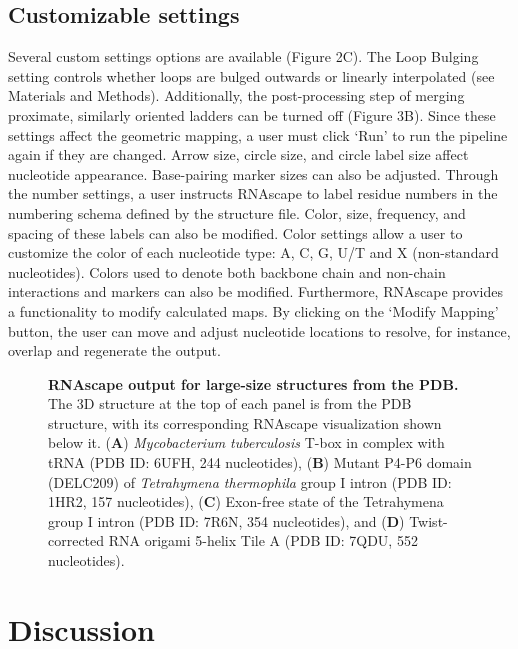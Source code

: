 \subsection{Customizable settings}

Several custom settings options are available (Figure 2C). The Loop Bulging setting controls whether loops are bulged outwards or linearly interpolated (see Materials and Methods). Additionally, the post-processing step of merging proximate, similarly oriented ladders can be turned off (Figure 3B). Since these settings affect the geometric mapping, a user must click ‘Run’ to run the pipeline again if they are changed. Arrow size, circle size, and circle label size affect nucleotide appearance. Base-pairing marker sizes can also be adjusted. Through the number settings, a user instructs RNAscape to label residue numbers in the numbering schema defined by the structure file. Color, size, frequency, and spacing of these labels can also be modified. Color settings allow a user to customize the color of each nucleotide type: A, C, G, U/T and X (non-standard nucleotides). Colors used to denote both backbone chain and non-chain interactions and markers can also be modified. Furthermore, RNAscape provides a functionality to modify calculated maps. By clicking on the ‘Modify Mapping’ button, the user can move and adjust nucleotide locations to resolve, for instance, overlap and regenerate the output.
\begin{center}
    \begin{figure}
        \caption[RNAscape output for large-size structures from the PDB.]{\textbf{RNAscape output for large-size structures from the PDB.} The 3D structure at the top of each panel is from the PDB structure, with its corresponding RNAscape visualization shown below it. ({\bf A}) \textit{Mycobacterium tuberculosis} T-box in complex with tRNA (PDB ID: 6UFH, 244 nucleotides), ({\bf B}) Mutant P4-P6 domain (DELC209) of \textit{Tetrahymena thermophila} group I intron (PDB ID: 1HR2, 157 nucleotides), ({\bf C}) Exon-free state of the Tetrahymena group I intron (PDB ID: 7R6N, 354 nucleotides), and ({\bf D}) Twist-corrected RNA origami 5-helix Tile A (PDB ID: 7QDU, 552 nucleotides).}
  \label{fig:rnascape4}
\end{figure}
\end{center}

\section{Discussion}

